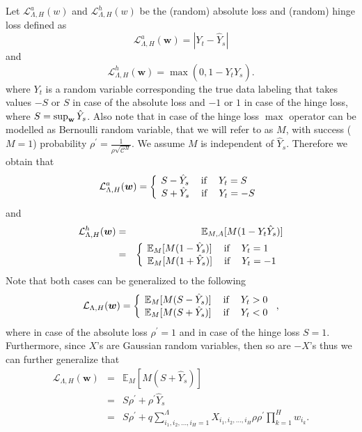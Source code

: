 \documentclass[twoside]{article}
\begin{document}
Let $\mathcal{L}^a_{\Lambda,H}(w)$ and $\mathcal{L}^h_{\Lambda,H}(w)$ be the (random) absolute loss and (random) hinge loss defined as
\[\mathcal{L}^a_{\Lambda,H}({\bm w}) = |Y_t - \hat{Y}_s|
\]
and
\[\mathcal{L}^h_{\Lambda,H}({\bm w}) = \max(0,1-Y_t\hat{Y}_s).
\]
where $Y_t$ is a random variable corresponding the true data labeling that takes values $-S$ or $S$ in case of the absolute loss and $-1$ or $1$ in case of the hinge loss, where $S = \sup_{\bf{w}}{\hat{Y}_s}$. Also note that in case of the hinge loss $\max$ operator can be modelled as Bernoulli random variable, that we will refer to as $M$, with success ($M = 1$) probability $\rho^{'} = \frac{1}{\rho\sqrt{\mathcal{C}^H}}$. We assume $M$ is independent of $\hat{Y}_s$. Therefore we obtain that
\[\mathcal{L}^a_{\Lambda,H}({\bm w}) = \left \{
  \begin{tabular}{c}
  $\!\!\!\!\!\!S - \hat{Y}_s$ $\:\:\:\:$if$\:\:\:\:$ $Y_t = S$ \\
  $\!S + \hat{Y}_s$ $\:\:\:\:$if$\:\:\:\:$ $Y_t = -S$ \\
  \end{tabular}
\right.
\]
and
\begin{eqnarray*}
\mathcal{L}^h_{\Lambda,H}({\bm w}) &=& \mathbb{E}_{M,A}[M(
1-Y_t\hat{Y}_s)]\\&=& \left \{
  \begin{tabular}{c}
  $\!\!\!\!\!\!\mathbb{E}_{M}[M(1 - \hat{Y}_s)]$ $\:\:\:\:$if$\:\:\:\:$ $Y_t = 1$ \\
  $\!\mathbb{E}_{M}[M(1 + \hat{Y}_s)]$ $\:\:\:\:$if$\:\:\:\:$ $Y_t = -1$ \\
  \end{tabular}
\right.
\end{eqnarray*}
Note that both cases can be generalized to the following
\[\mathcal{L}_{\Lambda,H}({\bm w}) = \left \{
  \begin{tabular}{c}
  $\!\mathbb{E}_{M}[M(S - \hat{Y}_s)]$ $\:\:\:\:$if$\:\:\:\:$ $Y_t  > 0$ \\
  $\!\mathbb{E}_{M}[M(S + \hat{Y}_s)]$ $\:\:\:\:$if$\:\:\:\:$ $Y_t < 0$ \\
  \end{tabular}
\right.,
\]
where in case of the absolute loss $\rho^{'} = 1$ and in case of the hinge loss $S = 1$. Furthermore, since $X$'s are Gaussian random variables, then so are $-X$'s thus we can further generalize that
\begin{eqnarray*}
\mathcal{L}_{\Lambda,H}({\bm w}) \!\!\!\!\!&=&\!\!\!\!\! \mathbb{E}_{M}[M(S + \hat{Y}_s)]\\
&=& \!\!\!\!\!S\rho^{'} \!+\! \rho^{'}\hat{Y}_s\\
&=& \!\!\!\!\!S\rho^{'} \!+\! q\sum_{i_1,i_2,\dots,i_H=1}^{\Lambda}\!\!\!\!\!\!\!X_{i_1,i_2,\dots,i_H}\rho\rho^{'}\prod_{k = 1}^{H}w_{i_k}.
\end{eqnarray*}
\end{document}
